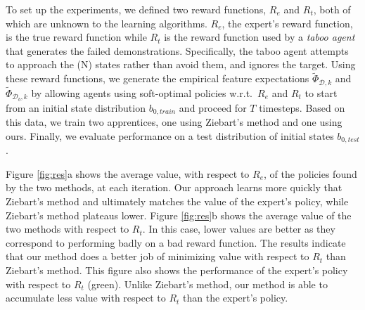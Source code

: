 \documentclass[conference]{IEEEtran}
\begin{document}
To set up the experiments, we defined two reward functions, $R_e$ and $R_t$, both of which are unknown to the learning algorithms.  $R_e$, the expert's reward function, is the true reward function while $R_t$ is the reward function used by a \emph{taboo agent} that generates the failed demonstrations. Specifically, the taboo agent attempts to approach the (N) states rather than avoid them, and ignores the target.  Using these reward functions, we generate the empirical feature expectations $\widetilde{\Phi}_{\mathcal{D},k}$ and $\widetilde{\Phi}_{\mathcal{D}_b,k}$ by allowing agents using soft-optimal policies w.r.t.\ $R_e$ and $R_t$ to start from an initial state distribution $b_{0,train}$ and proceed for $T$ timesteps.  Based on this data, we train two apprentices, one using Ziebart's method and one using ours.  Finally, we evaluate performance on a test distribution of initial states $b_{0,test}$. 




Figure \ref{fig:res}a shows the average value, with respect to $R_e$, of the policies found by the two methods, at each iteration.  Our approach learns more quickly that Ziebart's method and  ultimately matches the value of the expert's policy, while Ziebart's method plateaus lower. Figure \ref{fig:res}b shows the average value of the two methods with respect to $R_t$.  In this case, lower values are better as they correspond to performing badly on a bad reward function.  The results indicate that our method does a better job of minimizing value with respect to $R_t$ than Ziebart's method.  This figure also shows the performance of the expert's policy with respect to $R_t$ (green). Unlike Ziebart's method, our method is able to accumulate less value with respect to $R_t$ than the expert's policy.
\end{document}
